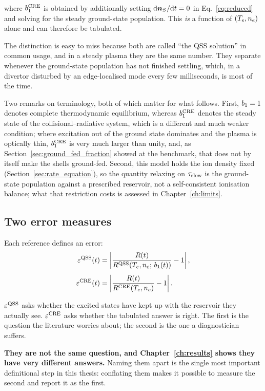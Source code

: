 \noindent where $b_1^{\mathrm{CRE}}$ is obtained by additionally setting
$\mathrm{d}\bm{n}_{S}/\mathrm{d}t = 0$ in Eq.~\eqref{eq:reduced} and solving for the
steady ground-state population. This \emph{is} a function of $(T_e,n_e)$ alone
and can therefore be tabulated.

The distinction is easy to miss because both are called ``the QSS solution'' in
common usage, and in a steady plasma they are the same number. They separate
whenever the ground-state population has not finished settling, which, in a
divertor disturbed by an edge-localised mode every few milliseconds, is most of
the time.

Two remarks on terminology, both of which matter for what follows. First,
$b_1 = 1$ denotes complete thermodynamic equilibrium, whereas
$b_1^{\mathrm{CRE}}$ denotes the steady state of the collisional--radiative
system, which is a different and much weaker condition; where excitation out of
the ground state dominates and the plasma is optically thin,
$b_1^{\mathrm{CRE}}$ is very much larger than unity, and, as
Section~\ref{sec:ground_fed_fraction} showed at the benchmark, that does not by
itself make the shells ground-fed. Second, this model holds the ion density
fixed (Section~\ref{sec:rate_equation}), so the quantity relaxing on $\tau_{\mathrm{slow}}$
is the ground-state population against a prescribed reservoir, not a
self-consistent ionisation balance; what that restriction costs is assessed in
Chapter~\ref{ch:limits}.

\subsection{Two error measures}

Each reference defines an error:
\begin{align}
  \varepsilon^{\mathrm{QSS}}(t) &= \left|\frac{R(t)}
                     {R^{\mathrm{QSS}}\!\left(T_e,n_e;\,b_1(t)\right)} - 1\right|,
  \label{eq:eps_qss}\\[4pt]
  \varepsilon^{\mathrm{CRE}}(t) &= \left|\frac{R(t)}
                     {R^{\mathrm{CRE}}\!\left(T_e,n_e\right)} - 1\right|.
  \label{eq:eps_cre}
\end{align}

$\varepsilon^{\mathrm{QSS}}$ asks whether the excited states have kept up with the reservoir they
actually see. $\varepsilon^{\mathrm{CRE}}$ asks whether the tabulated answer is right. The first is
the question the literature worries about; the second is the one a
diagnostician suffers.

\textbf{They are not the same question, and Chapter~\ref{ch:results} shows they
have very different answers.} Naming them apart is the single most important
definitional step in this thesis: conflating them makes it possible to measure
the second and report it as the first.


